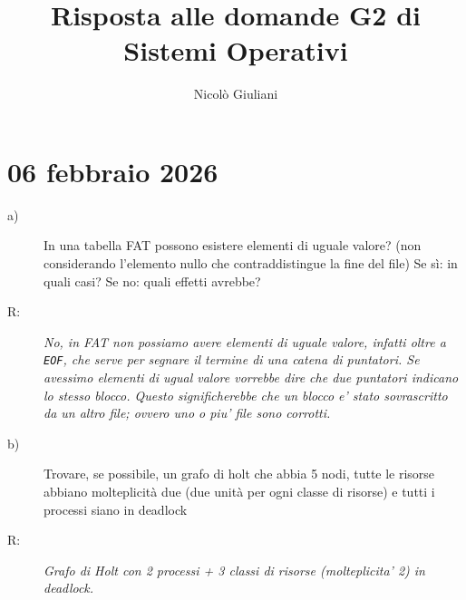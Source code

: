 \documentclass[a4paper,12pt]{article}
\title{Risposta alle domande G2 di Sistemi Operativi}
\author{Nicolò Giuliani}
\date{}
\newcommand{\datasection}[1]{%
    \section*{#1}%
    \addcontentsline{toc}{section}{#1}%
}
\newenvironment{exambox}{%
    \begin{mdframed}[
        linecolor=black!70,
        linewidth=0.6pt,
        innerleftmargin=8pt,
        innerrightmargin=8pt,
        innertopmargin=6pt,
        innerbottommargin=6pt
    ]
    \begin{description}
}{%
    \end{description}
    \end{mdframed}
}
\begin{document}
\maketitle
\tableofcontents   %
\newpage 

\datasection{06 febbraio 2026}
\begin{exambox}
  \item[a)] In una tabella FAT possono esistere elementi di uguale valore? (non considerando l’elemento nullo che
contraddistingue la fine del file) Se sì: in quali casi? Se no: quali effetti avrebbe?
  \item[R:] \textit{No, in FAT non possiamo avere elementi di uguale valore, infatti oltre a \texttt{EOF}, che serve per segnare il termine di una catena di puntatori. Se avessimo elementi di ugual valore vorrebbe dire che due puntatori indicano lo stesso blocco. Questo significherebbe che un blocco e' stato sovrascritto da un altro file; ovvero uno o piu' file sono corrotti.}

  \item[b)] Trovare, se possibile, un grafo di holt che abbia 5 nodi, tutte le risorse abbiano molteplicità due (due unità per
ogni classe di risorse) e tutti i processi siano in deadlock
  \item[R:] \textit{Grafo di Holt con 2 processi + 3 classi di risorse (molteplicita' 2) in deadlock.}\\
  \begin{center}
\end{center}
\end{exambox}
\end{document}
